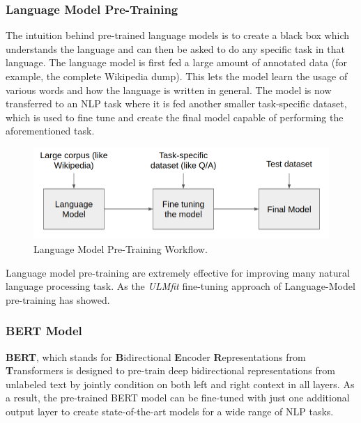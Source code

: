\documentclass[a4paper, 12pt]{article}
\begin{document}
\begin{sloppypar}
\subsubsection{Language Model Pre-Training}

The intuition behind pre-trained language models is to create a black box which understands the language and can then be asked to do any specific task in that language. The language model is first fed a large amount of annotated data (for example, the complete Wikipedia dump). This lets the model learn the usage of various words and how the language is written in general. The model is now transferred to an NLP task where it is fed another smaller task-specific dataset, which is used to fine tune and create the final model capable of performing the aforementioned task.\cite{ganesh_pre-trained_2019}

\begin{figure}[H]
\begin{center}
\includegraphics[scale=0.5]{lm.png}
\caption{ Language Model Pre-Training Workflow.\cite{ganesh_pre-trained_2019}} 
\end{center}
\end{figure}

Language model pre-training are extremely effective for improving many natural language processing task. As the \textit{ULMfit} fine-tuning approach of Language-Model pre-training has showed.\cite{howard_universal_2018}

\subsubsection{BERT Model}

\textbf{BERT}, which stands for \textbf{B}idirectional  \textbf{E}ncoder  \textbf{R}epresentations from  \textbf{T}ransformers is designed to pre-train deep bidirectional representations from unlabeled text by jointly condition on both left and right context in all layers. As a result, the pre-trained BERT model can be fine-tuned with just one additional output layer to create state-of-the-art models for a wide range of NLP tasks.\cite{devlin_bert_2019}


\end{sloppypar}
\end{document}

